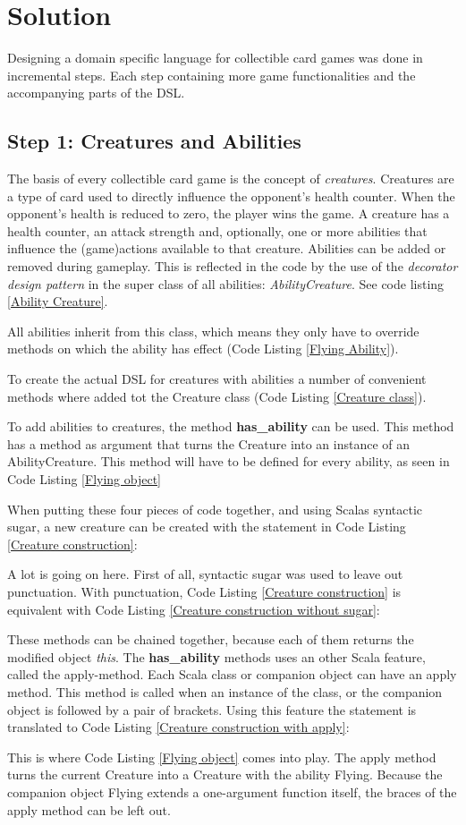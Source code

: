 \documentclass[twocolumn]{phdsymp}
\newcommand{\codepart}[4]{
\begin{figure*}[b]

\end{figure*}
}
\begin{document}
\section{Solution}
\label{Solution}
Designing a domain specific language for collectible card games was done in incremental steps. Each step containing more game functionalities and the accompanying parts of the DSL.
\subsection*{Step 1: Creatures and Abilities}
The basis of every collectible card game is the concept of \textit{creatures}. Creatures are a type of card used to directly influence the opponent's health counter. When the opponent's health is reduced to zero, the player wins the game. A creature has a health counter, an attack strength and, optionally, one or more abilities that influence the (game)actions available to that creature. Abilities can be added or removed during gameplay. This is reflected in the code by the use of the \textit{decorator design pattern} in the super class of all abilities: \textit{AbilityCreature}. See code listing \ref{Ability Creature}.
\codepart{code.scala}{Ability Creature}{2}{5}
All abilities inherit from this class, which means they only have to override methods on which the ability has effect (Code Listing \ref{Flying Ability}).
\codepart{code.scala}{Flying Ability}{7}{15}
To create the actual DSL for creatures with abilities a number of convenient methods where added tot the Creature class (Code Listing \ref{Creature class}).
\codepart{code.scala}{Creature class}{17}{37}
To add abilities to creatures, the method \textbf{has\_ability} can be used. This method has a method as argument that turns the Creature into an instance of an AbilityCreature. This method will have to be defined for every ability, as seen in Code Listing \ref{Flying object}
\codepart{code.scala}{Flying object}{39}{41}
When putting these four pieces of code together, and using Scalas syntactic sugar, a new creature can be created with the statement in Code Listing \ref{Creature construction}:
\codepart{code.scala}{Creature construction}{43}{43}
A lot is going on here. First of all, syntactic sugar was used to leave out punctuation. With punctuation, Code Listing \ref{Creature construction} is equivalent with Code Listing \ref{Creature construction without sugar}:
\codepart{code.scala}{Creature construction without sugar}{45}{45}
These methods can be chained together, because each of them returns the modified object \textit{this}. The \textbf{has\_ability} methods uses an other Scala feature, called the apply-method. Each Scala class or companion object can have an apply method. This method is called when an instance of the class, or the companion object is followed by a pair of brackets. Using this feature the statement is translated to Code Listing \ref{Creature construction with apply}:
\codepart{code.scala}{Creature construction with apply}{47}{47}This is where Code Listing \ref{Flying object} comes into play. The apply method turns the current Creature into a Creature with the ability Flying. Because the companion object Flying extends a one-argument function itself, the braces of the apply method can be left out.
\end{document}
